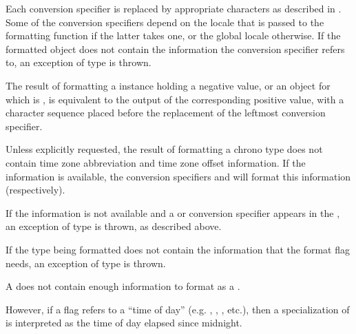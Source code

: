 \pnum
Each conversion specifier 
is replaced by appropriate characters
as described in .
Some of the conversion specifiers
depend on the locale that is passed to the formatting function
if the latter takes one,
or the global locale otherwise.
If the formatted object does not contain the information
the conversion specifier refers to,
an exception of type  is thrown.

\pnum
The result of formatting
a  instance holding a negative value, or
an  object  for which  is ,
is equivalent to the output of the corresponding positive value,
with a  character sequence
placed before the replacement of the leftmost conversion specifier.
\begin{example}
\end{example}

\pnum
Unless explicitly requested,
the result of formatting a chrono type
does not contain time zone abbreviation
and time zone offset information.
If the information is available,
the conversion specifiers  and 
will format this information (respectively).
\begin{note}
If the information is not available and
a  or 
conversion specifier appears in
the ,
an exception of type  is thrown,
as described above.
\end{note}

\pnum
If the type being formatted does not contain
the information that the format flag needs,
an exception of type  is thrown.
\begin{example}
A  does not contain enough information
to format as a .
\end{example}
However, if a flag refers to a ``time of day''
(e.g. , , , etc.),
then a specialization of  is interpreted as
the time of day elapsed since midnight.

